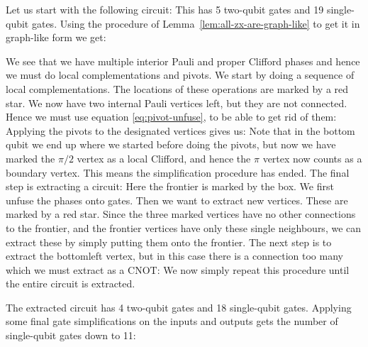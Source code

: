 \documentclass[a4paper,onecolumn,superscriptaddress,11pt,accepted=2020-04-27]{quantumarticle}
\newcommand{\CX}{\ensuremath{\textrm{CNOT}}\xspace}
\newcommand{\CNOT}{\CX}
\theoremstyle{definition}
\begin{document}



\noindent Let us start with the following circuit:
This has 5 two-qubit gates and 19 single-qubit gates. Using the procedure of Lemma~\ref{lem:all-zx-are-graph-like} to get it in graph-like form we get:

We see that we have multiple interior Pauli and proper Clifford phases and hence we must do local complementations and pivots. We start by doing a sequence of local complementations. 
The locations of these operations are marked by a red star.
We now have two internal Pauli vertices left, but they are not connected. Hence we must use equation \eqref{eq:pivot-unfuse}, to be able to get rid of them:
Applying the pivots to the designated vertices gives us:
Note that in the bottom qubit we end up where we started before doing the pivots, but now we have marked the $\pi/2$ vertex as a local Clifford, and hence the $\pi$ vertex now counts as a boundary vertex. This means the simplification procedure has ended. The final step is extracting a circuit:
Here the frontier is marked by the box. We first unfuse the phases onto gates. Then we want to extract new vertices. These are marked by a red star. Since the three marked vertices have no other connections to the frontier, and the frontier vertices have only these single neighbours, we can extract these by simply putting them onto the frontier. The next step is to extract the bottomleft vertex, but in this case there is a connection too many which we must extract as a \CNOT:
We now simply repeat this procedure until the entire circuit is extracted.

The extracted circuit has 4 two-qubit gates and 18 single-qubit gates. Applying some final gate simplifications on the inputs and outputs gets the number of single-qubit gates down to 11:
\vspace{0.3cm}
\end{document}
